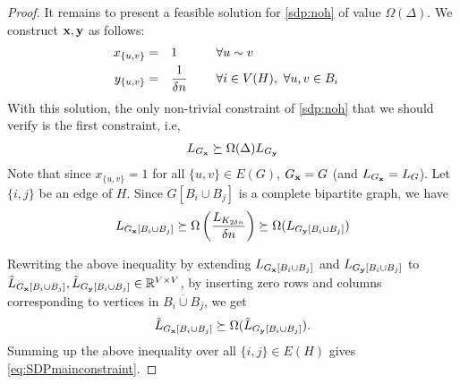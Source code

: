 \documentclass[11pt]{article}
\def\bx{{\bf x}}
\def\by{{\bf y}}
\def\R{\mathbb{R}}
\begin{document}
\begin{proof}
It remains to  present a feasible 
solution for \ref{sdp:noh}  of value $\Omega(\Delta)$. We  
construct $\bx,\by$ as follows: \\ 
\begin{equation*}
\begin{aligned}
 x_{\{u,v\}}&=& &1&  \hspace{3ex} &\forall u \sim v&   \\
 y_{\{u,v\}} &=& &\frac{1}{\delta n}& \hspace{3ex} &\forall i \in V(H), \, \, \forall u,v \in B_i& \\
\end{aligned}
\end{equation*}
With this solution, the only non-trivial constraint of  \ref{sdp:noh} that we should verify is the first constraint, i.e,
\begin{eqnarray}
\label{eq:SDPmainconstraint}
L_{G_{\bx}} \succeq \Omega(\Delta)L_{G_{\by}}
\end{eqnarray}
Note that since $x_{\{u,v\}}=1$ for all $\{u,v\}\in E(G)$, $G_\bx=G$ (and $L_{G_\bx}=L_G$).
Let $\{i,j\}$ be an edge of $H$. Since $G[B_i \cup B_j]$ is a complete bipartite graph, we have 
\begin{eqnarray}
\label{eq:hypercubeexpansion}
L_{G_\bx[B_i \cup B_j]} \succeq \Omega\left(\frac{L_{K_{2\delta n}}}{\delta n}\right)   \succeq \Omega(L_{G_\by[B_i \cup B_j]})
\end{eqnarray}


Rewriting the above inequality by extending $L_{G_\bx[B_i \cup B_j]}$ and $L_{G_\by[B_i \cup B_j]}$ to $\tilde{L}_{G_\bx[B_i\cup B_j]},\tilde{L}_{G_\by[B_i\cup B_j]}\in \R^{V\times V}$, by inserting zero rows and columns corresponding to vertices in $\overline{B_i\cup B_j}$, we get
$$ \tilde{L}_{G_\bx[B_i \cup B_j]} \succeq \Omega(\tilde{L}_{G_\by[B_i\cup B_j]}).$$ 
Summing up the above inequality  over all $\{i,j\} \in E(H)$ gives 
\eqref{eq:SDPmainconstraint}.
\end{proof}
\end{document}
